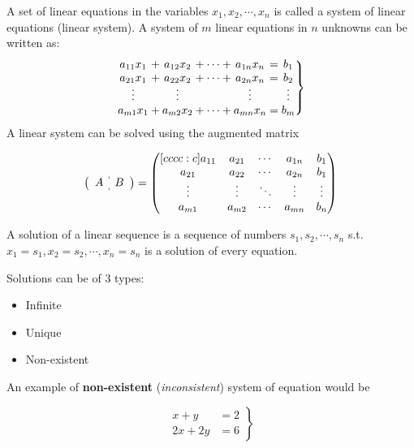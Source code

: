 \newpage
{}

A set of linear equations in the variables $x_1, x_2, \cdots, x_n$ is called a system of linear equations (linear system). A system of $m$ linear equations in $n$ unknowns can be written as:
\[
  \left.\begin{array}{@{}*{7}{c@{}}}
    a_{11} x_1 & {}+{} & a_{12} x_2 & {}+ \cdots +{} & a_{1n} x_n & {}={} & b_1\\
    a_{21} x_1 & {}+{} & a_{22} x_2 & {}+ \cdots +{} & a_{2n} x_n & {}={} & b_2\\[-2pt]
    \vdots     &       & \vdots     &                & \vdots     &       & \vdots\\
    a_{m1} x_1 & {}+{} & a_{m2} x_2 & {}+ \cdots +{} & a_{mn} x_n & {}={} & b_m
\end{array}\right\}
\]
A linear system can be solved using the augmented matrix 

\begin{equation*}
  \left(\begin{array}{c:c}A & B\end{array}\right) = 
    \begin{pmatrix}[cccc:c] 
    a_{11} & a_{21} & \cdots & a_{1n} & b_1\\
    a_{21} & a_{22} & \cdots & a_{2n} & b_1\\
    \vdots & \vdots & \ddots & \vdots & \vdots\\
    a_{m1} & a_{m2} & \cdots & a_{mn} & b_n
  \end{pmatrix} 
\end{equation*}  

A solution of a linear sequence is a sequence of numbers $s_1, s_2, \cdots , s_n$ s.t. $x_1 = s_1, x_2 = s_2 , \cdots , x_n = s_n$ is a solution of every equation.

Solutions can be of 3 types:

\begin{itemize}
  \item Infinite
  \item Unique
  \item Non-existent
\end{itemize}

An example of \textbf{non-existent} (\emph{inconsistent}) system of equation would be

\[ \left.\begin{array}{cr}
    x+y&=2\\
    2x+2y&=6
\end{array}\right\} \]

